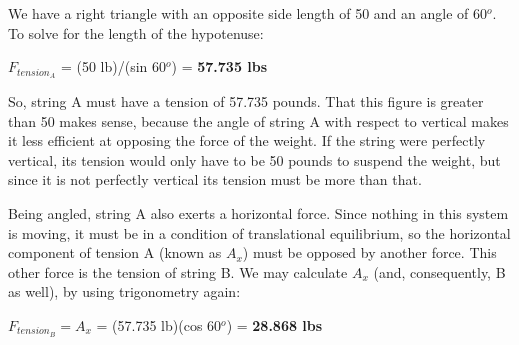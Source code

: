 We have a right triangle with an opposite side length of 50 and an angle of 60$^{o}$.  To solve for the length of the hypotenuse:

\vskip 10pt

$F_{tension_A}$ = (50 lb)/(sin 60$^{o}$) = {\bf 57.735 lbs}

\vskip 10pt

So, string A must have a tension of 57.735 pounds.  That this figure is greater than 50 makes sense, because the angle of string A with respect to vertical makes it less efficient at opposing the force of the weight.  If the string were perfectly vertical, its tension would only have to be 50 pounds to suspend the weight, but since it is not perfectly vertical its tension must be more than that.

\vskip 10pt

Being angled, string A also exerts a horizontal force.  Since nothing in this system is moving, it must be in a condition of translational equilibrium, so the horizontal component of tension A (known as $A_x$) must be opposed by another force.  This other force is the tension of string B.  We may calculate $A_x$ (and, consequently, B as well), by using trigonometry again:

\vskip 10pt

$F_{tension_B} = A_x$ = (57.735 lb)(cos 60$^{o}$) = {\bf 28.868 lbs}












